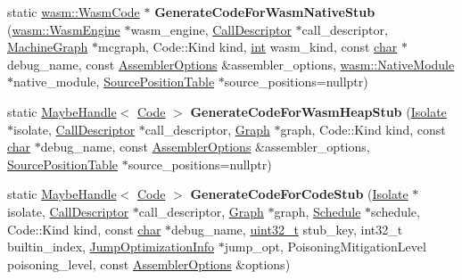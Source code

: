 \begin{DoxyCompactItemize}
static \mbox{\hyperlink{classv8_1_1internal_1_1wasm_1_1WasmCode}{wasm\+::\+Wasm\+Code}} $\ast$ {\bfseries Generate\+Code\+For\+Wasm\+Native\+Stub} (\mbox{\hyperlink{classv8_1_1internal_1_1wasm_1_1WasmEngine}{wasm\+::\+Wasm\+Engine}} $\ast$wasm\+\_\+engine, \mbox{\hyperlink{classv8_1_1internal_1_1compiler_1_1CallDescriptor}{Call\+Descriptor}} $\ast$call\+\_\+descriptor, \mbox{\hyperlink{classv8_1_1internal_1_1compiler_1_1MachineGraph}{Machine\+Graph}} $\ast$mcgraph, Code\+::\+Kind kind, \mbox{\hyperlink{classint}{int}} wasm\+\_\+kind, const \mbox{\hyperlink{classchar}{char}} $\ast$debug\+\_\+name, const \mbox{\hyperlink{structv8_1_1internal_1_1AssemblerOptions}{Assembler\+Options}} \&assembler\+\_\+options, \mbox{\hyperlink{classv8_1_1internal_1_1wasm_1_1NativeModule}{wasm\+::\+Native\+Module}} $\ast$native\+\_\+module, \mbox{\hyperlink{classv8_1_1internal_1_1compiler_1_1SourcePositionTable}{Source\+Position\+Table}} $\ast$source\+\_\+positions=nullptr)
\item 
\mbox{\label{classv8_1_1internal_1_1compiler_1_1Pipeline_a03e2a30f3e235b36edf4a1f86a97ac4b}} 
static \mbox{\hyperlink{classv8_1_1internal_1_1MaybeHandle}{Maybe\+Handle}}$<$ \mbox{\hyperlink{classv8_1_1internal_1_1Code}{Code}} $>$ {\bfseries Generate\+Code\+For\+Wasm\+Heap\+Stub} (\mbox{\hyperlink{classv8_1_1internal_1_1Isolate}{Isolate}} $\ast$isolate, \mbox{\hyperlink{classv8_1_1internal_1_1compiler_1_1CallDescriptor}{Call\+Descriptor}} $\ast$call\+\_\+descriptor, \mbox{\hyperlink{classv8_1_1internal_1_1compiler_1_1Graph}{Graph}} $\ast$graph, Code\+::\+Kind kind, const \mbox{\hyperlink{classchar}{char}} $\ast$debug\+\_\+name, const \mbox{\hyperlink{structv8_1_1internal_1_1AssemblerOptions}{Assembler\+Options}} \&assembler\+\_\+options, \mbox{\hyperlink{classv8_1_1internal_1_1compiler_1_1SourcePositionTable}{Source\+Position\+Table}} $\ast$source\+\_\+positions=nullptr)
\item 
\mbox{\label{classv8_1_1internal_1_1compiler_1_1Pipeline_a9900bd602dfd5c1a207fd31316f9e323}} 
static \mbox{\hyperlink{classv8_1_1internal_1_1MaybeHandle}{Maybe\+Handle}}$<$ \mbox{\hyperlink{classv8_1_1internal_1_1Code}{Code}} $>$ {\bfseries Generate\+Code\+For\+Code\+Stub} (\mbox{\hyperlink{classv8_1_1internal_1_1Isolate}{Isolate}} $\ast$isolate, \mbox{\hyperlink{classv8_1_1internal_1_1compiler_1_1CallDescriptor}{Call\+Descriptor}} $\ast$call\+\_\+descriptor, \mbox{\hyperlink{classv8_1_1internal_1_1compiler_1_1Graph}{Graph}} $\ast$graph, \mbox{\hyperlink{classv8_1_1internal_1_1compiler_1_1Schedule}{Schedule}} $\ast$schedule, Code\+::\+Kind kind, const \mbox{\hyperlink{classchar}{char}} $\ast$debug\+\_\+name, \mbox{\hyperlink{classuint32__t}{uint32\+\_\+t}} stub\+\_\+key, int32\+\_\+t builtin\+\_\+index, \mbox{\hyperlink{classv8_1_1internal_1_1JumpOptimizationInfo}{Jump\+Optimization\+Info}} $\ast$jump\+\_\+opt, Poisoning\+Mitigation\+Level poisoning\+\_\+level, const \mbox{\hyperlink{structv8_1_1internal_1_1AssemblerOptions}{Assembler\+Options}} \&options)

\end{DoxyCompactItemize}
